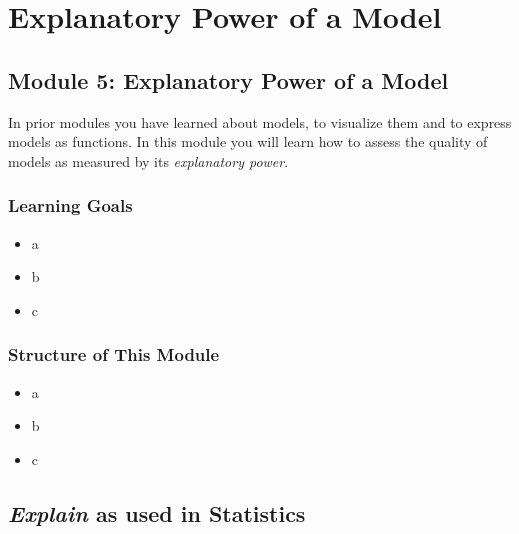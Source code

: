 \documentclass[
  12pt,
  letterpaper,
  DIV=11,
  numbers=noendperiod]{scrreprt}
\providecommand{\tightlist}{%
  \setlength{\itemsep}{0pt}\setlength{\parskip}{0pt}}
\begin{document}
\part{Explanatory Power of a Model}

\chapter*{Module 5: Explanatory Power of a
Model}\label{module-5-explanatory-power-of-a-model}


In prior modules you have learned about models, to visualize them and to
express models as functions. In this module you will learn how to assess
the quality of models as measured by its \emph{explanatory power}.

\section*{Learning Goals}\label{learning-goals-4}


\begin{itemize}
\tightlist
\item
  a
\item
  b
\item
  c
\end{itemize}

\section*{Structure of This Module}\label{structure-of-this-module-4}


\begin{itemize}
\tightlist
\item
  a
\item
  b
\item
  c
\end{itemize}

\chapter{\texorpdfstring{\emph{Explain} as used in
Statistics}{Explain as used in Statistics}}\label{explain-as-used-in-statistics}
\end{document}
